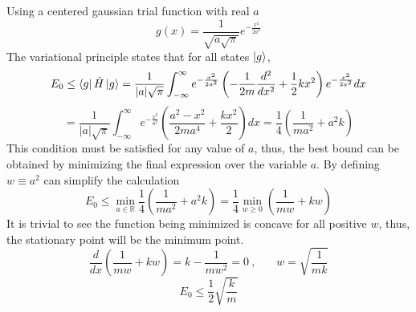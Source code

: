 \begin{sol}
Using a centered gaussian trial function with real $a$ \begin{equation}
	g(x)=\frac{1}{\sqrt{a\sqrt{\pi}}}e^{-\frac{x^2}{2a^2}}
\end{equation}
The variational principle states that for all states $\ket g$,
\begin{equation}
	E_0\leq\bra{g}\hat H\ket{g}=\frac{1}{|a|\sqrt\pi}\int_{-\infty}^\infty e^{-\frac{x^2}{2a^2}}\left(-\frac{1}{2m}\frac{d^2}{dx^2}+\frac{1}{2}kx^2\right)e^{-\frac{x^2}{2a^2}}dx
\end{equation}
\begin{equation}
	=\frac{1}{|a|\sqrt\pi}\int_{-\infty}^\infty e^{-\frac{x^2}{a^2}}\left(\frac{a^2-x^2}{2ma^4}+\frac{kx^2}{2}\right)dx=\frac{1}{4}\left(\frac{1}{ma^2}+a^2k\right)
\end{equation}
This condition must be satisfied for any value of $a$, thus, the best bound can be obtained by minimizing the final expression over the variable $a$. By defining $w\equiv a^2$ can simplify the calculation
\begin{equation}
	E_0\leq\min_{a\in\mathbb R}\frac{1}{4}\left(\frac{1}{ma^2}+a^2k\right)=\frac{1}{4}\min_{w\geq 0 }\left(\frac{1}{mw}+kw\right)
\end{equation}
It is trivial to see the function being minimized is concave for all positive $w$, thus, the stationary point will be the minimum point.
\begin{equation}
	\frac{d}{dx}\left(\frac{1}{mw}+kw\right)=k-\frac{1}{mw^2}=0\:,\:\:\:\:\:\:\:\:w=\sqrt{\frac{1}{mk}}
\end{equation}
\begin{equation}
	E_0\leq \frac{1}{2}\sqrt{\frac{k}{m}}
\end{equation}



\end{sol}
